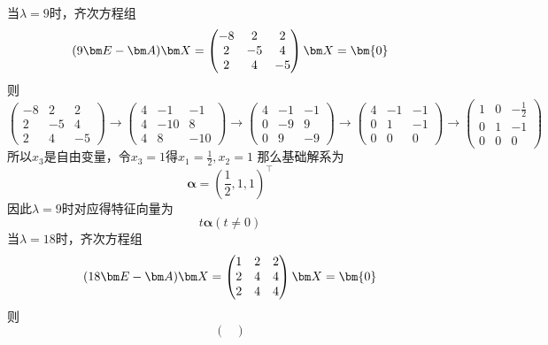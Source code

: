 \begin{solution}
    当$\lambda=9$时，齐次方程组
    \[
        (9\mat{E} - \mat{A})\mat{X} =
        \begin{pmatrix}
            -8 & 2  & 2  \\
            2  & -5 & 4  \\
            2  & 4  & -5
        \end{pmatrix}\mat{X}
        =\bm{0}
    \]
    则
    \[
        \begin{pmatrix}
            -8 & 2  & 2  \\
            2  & -5 & 4  \\
            2  & 4  & -5
        \end{pmatrix}
        \longrightarrow
        \begin{pmatrix}
            4 & -1  & -1  \\
            4 & -10 & 8   \\
            4 & 8   & -10
        \end{pmatrix}
        \longrightarrow
        \begin{pmatrix}
            4 & -1 & -1 \\
            0 & -9 & 9  \\
            0 & 9  & -9
        \end{pmatrix}
        \longrightarrow
        \begin{pmatrix}
            4 & -1 & -1 \\
            0 & 1  & -1 \\
            0 & 0  & 0
        \end{pmatrix}
        \longrightarrow
        \begin{pmatrix}
            1 & 0 & -\frac{1}{2} \\
            0 & 1 & -1           \\
            0 & 0 & 0
        \end{pmatrix}
    \]
    所以$x_3$是自由变量，令$x_3=1$得$x_1=\frac{1}{2},x_2=1$
    那么基础解系为
    \[
        \bm{\alpha} = \left(\frac{1}{2},1,1\right)^\intercal
    \]
    因此$\lambda = 9$时对应得特征向量为
    \[ t\bm{\alpha} (t\neq 0) \]
    当$\lambda=18$时，齐次方程组
    \[
        (18\mat{E} - \mat{A})\mat{X} =
        \begin{pmatrix}
            1 & 2 & 2 \\
            2 & 4 & 4 \\
            2 & 4 & 4
        \end{pmatrix}\mat{X}
        =\bm{0}
    \]
    则
    \[
        \begin{pmatrix}

\end{pmatrix}\]
\end{solution}
